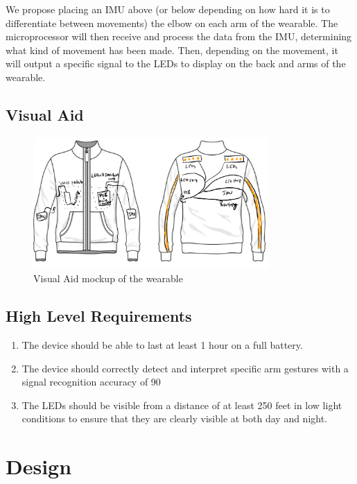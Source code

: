 \documentclass[12pt]{article}
\begin{document}
We propose placing an IMU above (or below depending on how hard 
it is to differentiate between movements) the elbow on each arm 
of the wearable. The microprocessor will then receive and process 
the data from the IMU, determining what kind of movement has been 
made. Then, depending on the movement, it will output a specific 
signal to the LEDs to display on the back and arms of the wearable. 


\subsection{Visual Aid}
\begin{figure}[ht]
    \centering
    \includegraphics[width=0.8\textwidth]{visual_aid.jpeg}
    \caption{Visual Aid mockup of the wearable}
    \label{fig:my_label}
\end{figure}
\subsection{High Level Requirements}
\begin{enumerate}
    \item The device should be able to last at least 1 hour on a full battery.
    \item The device should correctly detect and interpret specific arm 
    gestures with a signal recognition accuracy of 90%
    \item The LEDs should be visible from a distance of at least 
    250 feet in low light conditions to ensure that they are clearly visible at both day and night. 
\end{enumerate}
\newpage
\section{Design}
\end{document}
